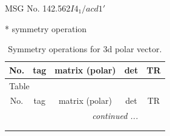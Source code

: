 \documentclass[fleqn,8pt]{jsarticle}
\begin{document}
\setcounter{MaxMatrixCols}{32}

\renewcommand{\tablename}{Table~}
\renewcommand{\figurename}{Figure~}
\begin{center}
\LARGE
MSG No. 142.562\quad$I4_{1}/acd1'$
\end{center}
* symmetry operation
\renewcommand{\arraystretch}{1.3}
\begin{longtable}{ccccc}
\caption{Symmetry operations for 3d polar vector.}
 \\
 \hline \hline
No. & tag & matrix (polar) & det & TR \\ \hline \endfirsthead

\multicolumn{4}{l}{\tablename\ \thetable{}} \\
 \hline \hline
No. & tag & matrix (polar) & det & TR \\ \hline \endhead

 \hline \hline
\multicolumn{4}{r}{\footnotesize\it continued ...} \\ \endfoot

 \hline \hline
\multicolumn{4}{r}{} \\ \endlastfoot


\end{longtable}
\end{document}
